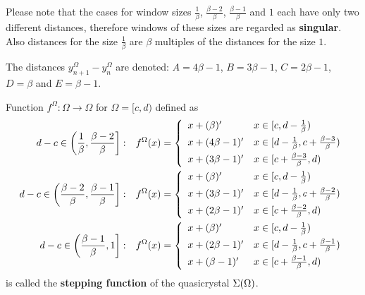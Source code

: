 \documentclass[text.tex]{subfiles}
\begin{document}
\begin{remark}
Please note that the cases for window sizes $\frac{1}{\beta}$, $\frac{\beta-2}{\beta}$, $\frac{\beta-1}{\beta}$ and $1$ each have only two different distances, therefore windows of these sizes are regarded as \textbf{singular}. Also distances for the size $\frac{1}{\beta}$ are $\beta$ multiples of the distances for the size $1$.
\end{remark}

\begin{definition}
\label{def:distancesNotation}
The distances $y_{n+1}^\Omega-y_n^\Omega$ are denoted: $A = 4\beta-1$, $B = 3\beta-1$, $C = 2\beta-1$, $D = \beta$ and $E = \beta-1$.
\end{definition}

\begin{definition}
\label{def:steppingFunction}
Function $f^\Omega: \Omega \to \Omega$ for $\Omega = [c,d)$ defined as
\begin{align*}
d-c \in \left( \frac{1}{\beta}, \frac{\beta - 2}{\beta} \right]:& \quad
		f^\Omega(x) = \left\{ \begin{array}{l l}
			x + (\beta)' 	& x\in [c,d-\frac{1}{\beta})\\[1.5mm]
			x + (4\beta-1)' & x\in [d-\frac{1}{\beta},c+\frac{\beta - 3}{\beta})\\[1.5mm]
			x + (3\beta-1)' & x\in [c+\frac{\beta - 3}{\beta},d)
		\end{array} \right.
\\
d-c \in \left( \frac{\beta-2}{\beta}, \frac{\beta-1}{\beta} \right]:& \quad
		f^\Omega(x) = \left\{ \begin{array}{l l}
			x + (\beta)' 	& x\in [c,d-\frac{1}{\beta})\\[1.5mm]
			x + (3\beta-1)' & x\in [d-\frac{1}{\beta},c+\frac{\beta - 2}{\beta})\\[1.5mm]
			x + (2\beta-1)' & x\in [c+\frac{\beta - 2}{\beta},d)
		\end{array} \right.
\\
d-c \in \left( \frac{\beta-1}{\beta}, 1 \right]:& \quad
		f^\Omega(x) = \left\{ \begin{array}{l l}
			x + (\beta)' 	& x\in [c,d-\frac{1}{\beta})\\[1.5mm]
			x + (2\beta-1)' & x\in [d-\frac{1}{\beta},c+\frac{\beta - 1}{\beta})\\[1.5mm]
			x + (\beta-1)' & x\in [c+\frac{\beta - 1}{\beta},d)
		\end{array} \right.
\end{align*}
is called the \textbf{stepping function} of the quasicrystal $\Sigma(\Omega)$. 
\end{definition}
\end{document}

